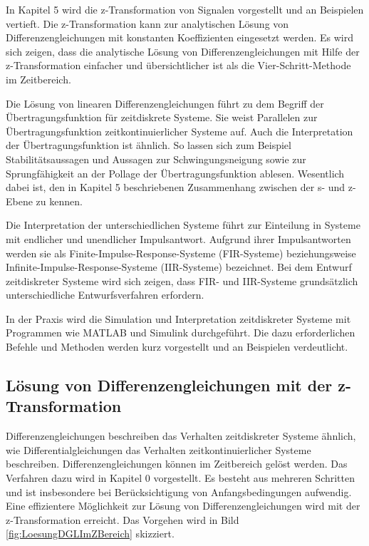 \noindent In Kapitel 5 wird die z-Transformation von Signalen vorgestellt und an Beispielen vertieft. Die z-Transformation kann zur analytischen L\"{o}sung von Differenzengleichungen mit konstanten Koeffizienten eingesetzt werden. Es wird sich zeigen, dass die analytische L\"{o}sung von Differenzengleichungen mit Hilfe der z-Transformation einfacher und \"{u}bersichtlicher ist als die Vier-Schritt-Methode im Zeitbereich.\newline

\noindent Die L\"{o}sung von linearen Differenzengleichungen f\"{u}hrt zu dem Begriff der \"{U}bertragungsfunktion f\"{u}r zeitdiskrete Systeme. Sie weist Parallelen zur \"{U}bertragungsfunktion zeitkontinuierlicher Systeme auf. Auch die Interpretation der \"{U}bertragungsfunktion ist \"{a}hnlich. So lassen sich zum Beispiel Stabilit\"{a}tsaussagen und Aussagen zur Schwingungsneigung sowie zur Sprungf\"{a}higkeit an der Pollage der \"{U}bertragungsfunktion ablesen. Wesentlich dabei ist, den in Kapitel 5 beschriebenen Zusammenhang zwischen der s- und z-Ebene zu kennen. \newline

\noindent Die Interpretation der unterschiedlichen Systeme f\"{u}hrt zur Einteilung in Systeme mit endlicher und unendlicher Impulsantwort. Aufgrund ihrer Impulsantworten werden sie als Finite-Impulse-Response-Systeme (FIR-Systeme) beziehungsweise Infinite-Impulse-Response-Systeme (IIR-Systeme) bezeichnet. Bei dem Entwurf zeitdiskreter Systeme wird sich zeigen, dass FIR- und IIR-Systeme grunds\"{a}tzlich unterschiedliche Entwurfsverfahren erfordern.\newline

\noindent In der Praxis wird die Simulation und Interpretation zeitdiskreter Systeme mit Programmen wie MATLAB und Simulink durchgef\"{u}hrt. Die dazu erforderlichen Befehle und Methoden werden kurz vorgestellt und an Beispielen verdeutlicht.

\subsection{L\"{o}sung von Differenzengleichungen mit der z-Transformation}

\noindent Differenzengleichungen beschreiben das Verhalten zeitdiskreter Systeme \"{a}hnlich, wie Differentialgleichungen das Verhalten zeitkontinuierlicher Systeme beschreiben. Differenzengleichungen k\"{o}nnen im Zeitbereich gel\"{o}st werden. Das Verfahren dazu wird in Kapitel 0 vorgestellt. Es besteht aus mehreren Schritten und ist insbesondere bei Ber\"{u}cksichtigung von Anfangsbedingungen aufwendig. Eine effizientere M\"{o}glichkeit zur L\"{o}sung von Differenzengleichungen wird mit der z-Transformation erreicht. Das Vorgehen wird in Bild \ref{fig:LoesungDGLImZBereich} skizziert.

